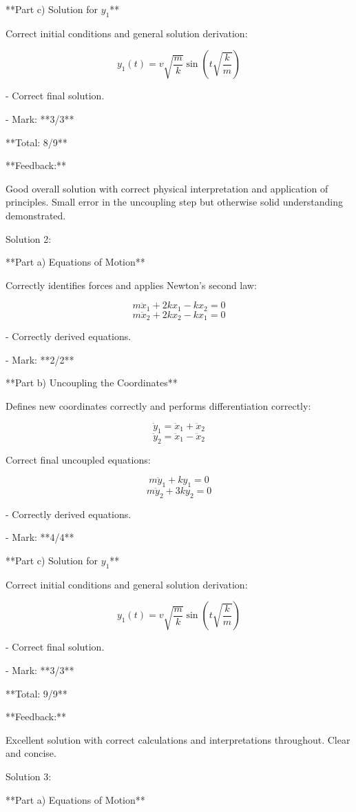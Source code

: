\documentclass[a4paper,11pt]{article}
\begin{document}
**Part c) Solution for \( y_{1} \)**

Correct initial conditions and general solution derivation:

\[ y_{1}(t) = v \sqrt{\frac{m}{k}} \sin(t \sqrt{\frac{k}{m}}) \]

- Correct final solution.

- Mark: **3/3**

**Total: 8/9**

**Feedback:**

Good overall solution with correct physical interpretation and application of principles. Small error in the uncoupling step but otherwise solid understanding demonstrated.

Solution 2:

**Part a) Equations of Motion**

Correctly identifies forces and applies Newton's second law:

\[ m \ddot{x}_{1} + 2kx_{1} - kx_{2} = 0 \]
\[ m \ddot{x}_{2} + 2kx_{2} - kx_{1} = 0 \]

- Correctly derived equations.

- Mark: **2/2**

**Part b) Uncoupling the Coordinates**

Defines new coordinates correctly and performs differentiation correctly:

\[ \ddot{y}_{1} = \ddot{x}_{1} + \ddot{x}_{2} \]
\[ \ddot{y}_{2} = \ddot{x}_{1} - \ddot{x}_{2} \]

Correct final uncoupled equations:

\[ m \ddot{y}_{1} + ky_{1} = 0 \]
\[ m \ddot{y}_{2} + 3ky_{2} = 0 \]

- Correctly derived equations.

- Mark: **4/4**

**Part c) Solution for \( y_{1} \)**

Correct initial conditions and general solution derivation:

\[ y_{1}(t) = v \sqrt{\frac{m}{k}} \sin(t \sqrt{\frac{k}{m}}) \]

- Correct final solution.

- Mark: **3/3**

**Total: 9/9**

**Feedback:**

Excellent solution with correct calculations and interpretations throughout. Clear and concise.

Solution 3:

**Part a) Equations of Motion**
\end{document}
